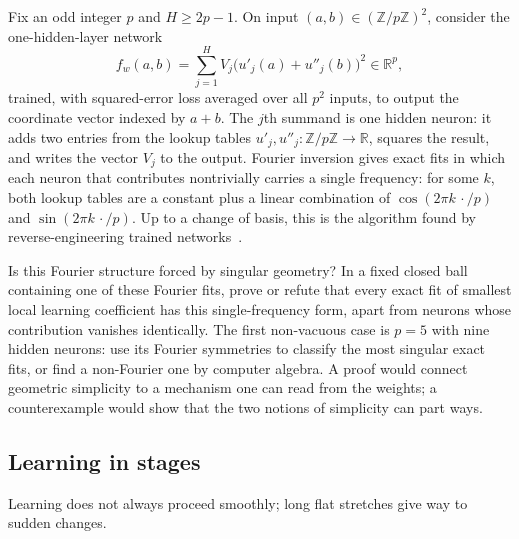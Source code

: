 \begin{openproblem}
Fix an odd integer $p$ and $H\geq 2p-1$. On input $(a,b)\in(\mathbb{Z}/p\mathbb{Z})^2$, consider the one-hidden-layer network
\[
   f_w(a,b)=\sum_{j=1}^H V_j\bigl(u'_j(a)+u''_j(b)\bigr)^2\in\mathbb{R}^p,
\]
trained, with squared-error loss averaged over all $p^2$ inputs, to output the coordinate vector indexed by $a+b$. The $j$th summand is one hidden neuron: it adds two entries from the lookup tables $u'_j,u''_j\colon\mathbb{Z}/p\mathbb{Z}\to\mathbb{R}$, squares the result, and writes the vector $V_j$ to the output. Fourier inversion gives exact fits in which each neuron that contributes nontrivially carries a single frequency: for some $k$, both lookup tables are a constant plus a linear combination of $\cos(2\pi k\,\cdot/p)$ and $\sin(2\pi k\,\cdot/p)$. Up to a change of basis, this is the algorithm found by reverse-engineering trained networks~\cite{nanda2023}.

Is this Fourier structure forced by singular geometry? In a fixed closed ball containing one of these Fourier fits, prove or refute that every exact fit of smallest local learning coefficient has this single-frequency form, apart from neurons whose contribution vanishes identically. The first non-vacuous case is $p=5$ with nine hidden neurons: use its Fourier symmetries to classify the most singular exact fits, or find a non-Fourier one by computer algebra. A proof would connect geometric simplicity to a mechanism one can read from the weights; a counterexample would show that the two notions of simplicity can part ways.
\end{openproblem}

\subsection{Learning in stages}

Learning does not always proceed smoothly; long flat stretches give way to sudden changes.

